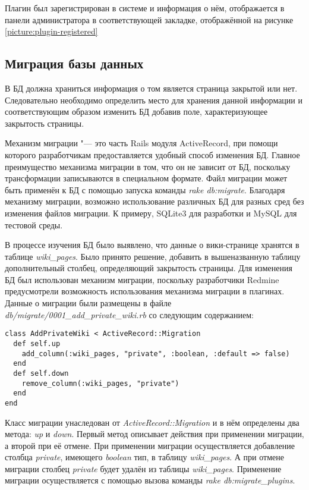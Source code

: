 Плагин был зарегистрирован в системе и информация о нём, отображается в панели
администратора в соответствующей закладке, отображённой на рисунке
\ref{picture:plugin-registered}

\subsection{Миграция базы данных} 
\label{section:migration}
В БД должна храниться информация о том является страница закрытой или нет.
Следовательно необходимо определить место для хранения данной информации и
соответствующим образом изменить БД добавив поле, характеризующее закрытость
страницы. 

Механизм миграции "--- это часть Rails модуля ActiveRecord, при помощи которого
разработчикам предоставляется удобный способ изменения БД. Главное преимущество
механизма миграции в том, что он не зависит от БД, поскольку трансформации
записываются в специальном формате. Файл миграции может быть применён к БД с
помощью запуска команды \textit{rake db:migrate}. Благодаря механизму миграции,
возможно использование различных БД для разных сред без изменения файлов
миграции. К примеру, SQLite3 для разработки и MySQL для тестовой среды.

В процессе изучения БД было выявлено, что данные о вики-странице хранятся в
таблице \textit{wiki\_pages}. Было принято решение, добавить в вышеназванную
таблицу дополнительный столбец, определяющий закрытость страницы. Для изменения
БД был использован механизм миграции, поскольку разработчики Redmine
предусмотрели возможность использования механизма миграции в плагинах. Данные о
миграции были размещены в файле \textit{db/migrate/0001\_add\_private\_wiki.rb}
со следующим содержанием:
\small{\begin{lstlisting}
class AddPrivateWiki < ActiveRecord::Migration
  def self.up
    add_column(:wiki_pages, "private", :boolean, :default => false)
  end
  def self.down
    remove_column(:wiki_pages, "private")
  end
end
\end{lstlisting}}
Класс миграции унаследован от \textit{ActiveRecord::Migration} и  в нём
определены два метода: \textit{up} и \textit{down}.
Первый метод описывает действия при применении миграции, а второй при её
отмене. При применении миграции осуществляется добавление столбца
\textit{private}, имеющего \textit{boolean} тип, в таблицу
\textit{wiki\_pages}. А при отмене миграции столбец \textit{private} будет
удалён из таблицы \textit{wiki\_pages}. Применение миграции осуществляется с
помощью вызова команды \textit{rake db:migrate\_plugins}.

